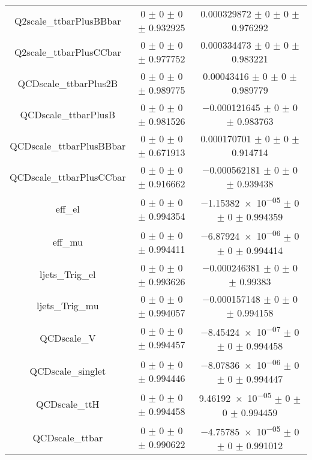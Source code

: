 \begin{table}
\begin{tabular}{ccc}
Q2scale\_ttbarPlusBBbar & \num{0} $\pm$ \num{0} $\pm$ \num{0} $\pm$ \num{0.932925} & \num{0.000329872} $\pm$ \num{0} $\pm$ \num{0} $\pm$ \num{0.976292}\\
Q2scale\_ttbarPlusCCbar & \num{0} $\pm$ \num{0} $\pm$ \num{0} $\pm$ \num{0.977752} & \num{0.000334473} $\pm$ \num{0} $\pm$ \num{0} $\pm$ \num{0.983221}\\
QCDscale\_ttbarPlus2B & \num{0} $\pm$ \num{0} $\pm$ \num{0} $\pm$ \num{0.989775} & \num{0.00043416} $\pm$ \num{0} $\pm$ \num{0} $\pm$ \num{0.989779}\\
QCDscale\_ttbarPlusB & \num{0} $\pm$ \num{0} $\pm$ \num{0} $\pm$ \num{0.981526} & \num{-0.000121645} $\pm$ \num{0} $\pm$ \num{0} $\pm$ \num{0.983763}\\
QCDscale\_ttbarPlusBBbar & \num{0} $\pm$ \num{0} $\pm$ \num{0} $\pm$ \num{0.671913} & \num{0.000170701} $\pm$ \num{0} $\pm$ \num{0} $\pm$ \num{0.914714}\\
QCDscale\_ttbarPlusCCbar & \num{0} $\pm$ \num{0} $\pm$ \num{0} $\pm$ \num{0.916662} & \num{-0.000562181} $\pm$ \num{0} $\pm$ \num{0} $\pm$ \num{0.939438}\\
eff\_el & \num{0} $\pm$ \num{0} $\pm$ \num{0} $\pm$ \num{0.994354} & \num{-1.15382e-05} $\pm$ \num{0} $\pm$ \num{0} $\pm$ \num{0.994359}\\
eff\_mu & \num{0} $\pm$ \num{0} $\pm$ \num{0} $\pm$ \num{0.994411} & \num{-6.87924e-06} $\pm$ \num{0} $\pm$ \num{0} $\pm$ \num{0.994414}\\
ljets\_Trig\_el & \num{0} $\pm$ \num{0} $\pm$ \num{0} $\pm$ \num{0.993626} & \num{-0.000246381} $\pm$ \num{0} $\pm$ \num{0} $\pm$ \num{0.99383}\\
ljets\_Trig\_mu & \num{0} $\pm$ \num{0} $\pm$ \num{0} $\pm$ \num{0.994057} & \num{-0.000157148} $\pm$ \num{0} $\pm$ \num{0} $\pm$ \num{0.994158}\\
QCDscale\_V & \num{0} $\pm$ \num{0} $\pm$ \num{0} $\pm$ \num{0.994457} & \num{-8.45424e-07} $\pm$ \num{0} $\pm$ \num{0} $\pm$ \num{0.994458}\\
QCDscale\_singlet & \num{0} $\pm$ \num{0} $\pm$ \num{0} $\pm$ \num{0.994446} & \num{-8.07836e-06} $\pm$ \num{0} $\pm$ \num{0} $\pm$ \num{0.994447}\\
QCDscale\_ttH & \num{0} $\pm$ \num{0} $\pm$ \num{0} $\pm$ \num{0.994458} & \num{9.46192e-05} $\pm$ \num{0} $\pm$ \num{0} $\pm$ \num{0.994459}\\
QCDscale\_ttbar & \num{0} $\pm$ \num{0} $\pm$ \num{0} $\pm$ \num{0.990622} & \num{-4.75785e-05} $\pm$ \num{0} $\pm$ \num{0} $\pm$ \num{0.991012}\\

\end{tabular}
\end{table}
